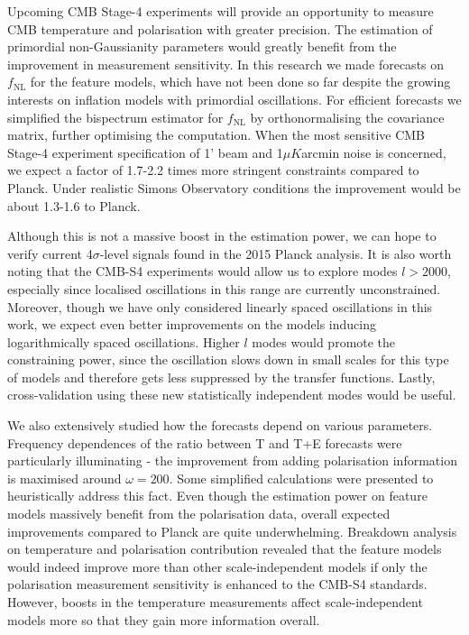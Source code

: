 Upcoming CMB Stage-4 experiments will provide an opportunity to measure CMB temperature and polarisation with greater precision. The estimation of primordial non-Gaussianity parameters would greatly benefit from the improvement in measurement sensitivity. In this research we made forecasts on $f_\text{NL}$ for the feature models, which have not been done so far despite the growing interests on inflation models with primordial oscillations. For efficient forecasts we simplified the bispectrum estimator for $f_\text{NL}$ by orthonormalising the covariance matrix, further optimising the computation. When the most sensitive CMB Stage-4 experiment specification of 1' beam and 1$\mu K$arcmin noise is concerned, we expect a factor of 1.7-2.2 times more stringent constraints compared to Planck. Under realistic Simons Observatory conditions the improvement would be about 1.3-1.6 to Planck.

Although this is not a massive boost in the estimation power, we can hope to verify current 4$\sigma$-level signals found in the 2015 Planck analysis. It is also worth noting that the CMB-S4 experiments would allow us to explore modes $l>2000$, especially since localised oscillations in this range are currently unconstrained. Moreover, though we have only considered linearly spaced oscillations in this work, we expect even better improvements on the models inducing logarithmically spaced oscillations. Higher $l$ modes would promote the constraining power, since the oscillation slows down in small scales for this type of models and therefore gets less suppressed by the transfer functions. Lastly, cross-validation using these new statistically independent modes would be useful.

We also extensively studied how the forecasts depend on various parameters. Frequency dependences of the ratio between T and T+E forecasts were particularly illuminating - the improvement from adding polarisation information is maximised around $\omega = 200$. Some simplified calculations were presented to heuristically address this fact. Even though the estimation power on feature models massively benefit from the polarisation data, overall expected improvements compared to Planck are quite underwhelming. Breakdown analysis on temperature and polarisation contribution revealed that the feature models would indeed improve more than other scale-independent models if only the polarisation measurement sensitivity is enhanced to the CMB-S4 standards. However, boosts in the temperature measurements affect scale-independent models more so that they gain more information overall.